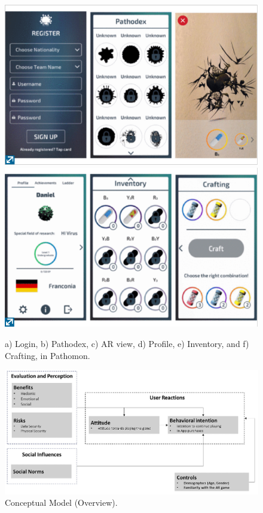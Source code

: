 \documentclass[runningheads]{llncs}
\begin{document}
\begin{figure}
    \centering
    \includegraphics[scale = 0.7]{Pathomon1.png}
    \includegraphics[scale = 0.7]{Pathomon2.png}
    \caption{a) Login, b) Pathodex, c) AR view, d) Profile, e) Inventory, and f) Crafting, in Pathomon. \cite{ref_article9}}
    \label{fig:pathomon}
\end{figure}

\begin{figure}
    \centering
    \includegraphics[width=\textwidth]{Screenshot_23.png}
    \caption{Conceptual Model (Overview). \cite{ref_article15}}
    \label{fig:model}
\end{figure}
\end{document}
